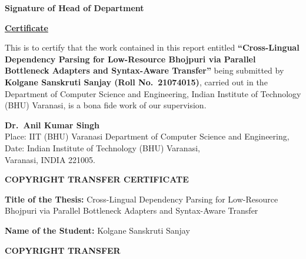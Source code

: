 \documentclass[12pt,a4paper,oneside]{report}
\begin{document}
\vspace{1.5cm}
\begin{center}
\textbf{Signature of Head of Department}
\end{center}

\newpage
\thispagestyle{plain}
\begin{center}
{\Large \textbf{\underline{Certificate}}}
\end{center}
\vspace{1cm}

\noindent This is to certify that the work contained in this report entitled
\textbf{``Cross-Lingual Dependency Parsing for Low-Resource Bhojpuri via Parallel
Bottleneck Adapters and Syntax-Aware Transfer''} being submitted by
\textbf{Kolgane Sanskruti Sanjay (Roll No.\ 21074015)}, carried out in the
Department of Computer Science and Engineering, Indian Institute of Technology
(BHU) Varanasi, is a bona fide work of our supervision.

\vspace{3cm}
\begin{flushright}
\textbf{Dr.\ Anil Kumar Singh}\\
Place: IIT (BHU) Varanasi \hspace{2cm} Department of Computer Science and Engineering,\\
Date: \hspace{2cm} Indian Institute of Technology (BHU) Varanasi,\\
\hspace{2cm} Varanasi, INDIA 221005.
\end{flushright}

\newpage
\thispagestyle{plain}
\begin{center}
{\large \textbf{COPYRIGHT TRANSFER CERTIFICATE}}
\end{center}
\vspace{1cm}

\noindent\textbf{Title of the Thesis:} Cross-Lingual Dependency Parsing for Low-Resource
Bhojpuri via Parallel Bottleneck Adapters and Syntax-Aware Transfer

\vspace{0.3cm}
\noindent\textbf{Name of the Student:} Kolgane Sanskruti Sanjay

\vspace{1.5cm}
\begin{center}
{\large \textbf{COPYRIGHT TRANSFER}}
\end{center}
\vspace{0.5cm}
\end{document}
